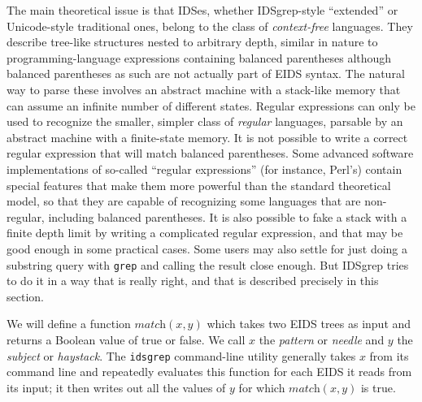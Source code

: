 \documentclass[twocolumn]{report}
\begin{document}
The main theoretical issue is that IDSes, whether IDSgrep-style ``extended''
or Unicode-style traditional ones, belong to the class of
\emph{context-free} languages.  They describe tree-like structures nested to
arbitrary depth, similar in nature to programming-language expressions
containing balanced parentheses although balanced parentheses as such are
not actually part of EIDS syntax.  The natural way to parse these involves
an abstract machine with a stack-like memory that can assume an infinite
number of different states.  Regular expressions can only be used to
recognize the smaller, simpler class of \emph{regular} languages, parsable
by an abstract machine with a finite-state memory.  It is not possible to
write a correct regular expression that will match balanced parentheses. 
Some advanced software implementations of so-called ``regular expressions''
(for instance, Perl's) contain special features that make them more powerful
than the standard theoretical model, so that they are capable of recognizing
some languages that are non-regular, including balanced parentheses.  It is
also possible to fake a stack with a finite depth limit by writing a
complicated regular expression, and that may be good enough in some
practical cases.  Some users may also settle for just doing a substring
query with \texttt{grep} and calling the result close enough.  But IDSgrep
tries to do it in a way that is really right, and that is described
precisely in this section.

We will define a function $\textit{match}(x,y)$ which takes two EIDS trees
as input and returns a Boolean value of true or false.  We
call $x$ the \emph{pattern} or \emph{needle} and $y$ the \emph{subject} or
\emph{haystack}.  The \texttt{idsgrep} command-line utility generally takes
$x$ from its command line and repeatedly evaluates this function for each
EIDS it reads from its input; it then writes out all the values of $y$ for
which $\textit{match}(x,y)$ is true.
\end{document}
